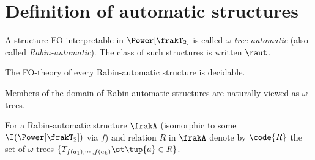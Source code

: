 \iffalse
??? ALT DFN ???

\begin{definition}
\begin{enumerate}
\item A structure FO-interpretable in $\Power_f(\frakT_1)$ is called {\em finite-string automatic}.
\item A structure FO-interpretable in $\Power(\frakT_1)$ is called {\em $\omega$-string automatic}.
\item A structure FO-interpretable in $\Power_f(\frakT_2)$ is called {\em finite-tree automatic}.
\item A structure FO-interpretable in $\Power(\frakT_2)$ is called {\em $\omega$-tree automatic}.
\end{enumerate}
\end{definition}
\fi


\section{Definition of automatic structures}

\begin{definition}
A structure FO-interpretable in $\Power[\frakT_2]$ is called {\em $\omega$-tree automatic} (also called {\em Rabin-automatic}). The class of such structures is written $\raut$.
\end{definition}

\begin{corollary}
The FO-theory of every Rabin-automatic structure is decidable.
\end{corollary}

Members of the domain of Rabin-automatic structures are naturally viewed as $\omega$-trees. 

\begin{definition}
For a Rabin-automatic structure $\frakA$ (isomorphic to some $\I(\Power[\frakT_2])$ via $f$) and relation $R$ in $\frakA$ denote by
$\code{R}$ the set of $\omega$-trees $\{T_{f(a_1),\cdots,f(a_k)} \st  \tup{a} \in R\}$.
\end{definition}

